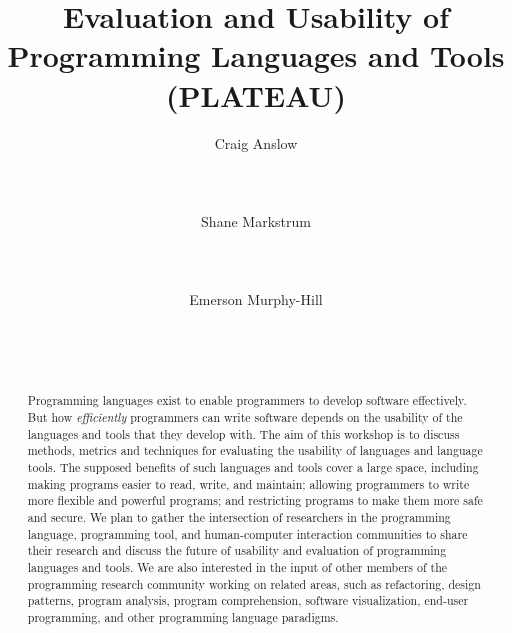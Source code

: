 \documentclass{acm_proc_article-sp}
\begin{document}
\title{Evaluation and Usability of Programming Languages and Tools (PLATEAU)}

\author{
\alignauthor Craig Anslow\\
       \\
       \\
       \\
\alignauthor Shane Markstrum\\
       \\
       \\
       \\
\alignauthor Emerson Murphy-Hill\\
       \\
       \\
       \\
       }

\date{}

\maketitle
\begin{abstract}

  Programming languages exist to enable
  programmers to develop software effectively.  But how
  \emph{efficiently} programmers can write software depends on the
  usability of the languages and tools that they develop with.  The
  aim of this workshop is to discuss methods, metrics and techniques
  for evaluating the usability of languages and language tools.  The
  supposed benefits of such languages and tools cover a large space,
  including making programs easier to read, write, and maintain;
  allowing programmers to write more flexible and powerful programs;
  and restricting programs to make them more safe and secure. We plan
  to gather the intersection of researchers in the
  programming language, programming tool, and human-computer interaction communities
  to share their research and
  discuss the future of usability and evaluation of programming
  languages and tools. We are also interested in the input of other members of
  the programming research community working on related areas, such as
  refactoring, design patterns, program analysis, program
  comprehension, software visualization, end-user programming, and
 other programming language paradigms.

\end{abstract}
\end{document}
